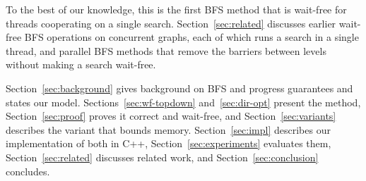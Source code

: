 To the best of our knowledge, this is the first BFS method that is wait-free for threads cooperating on a single search. Section~\ref{sec:related} discusses earlier wait-free BFS operations on concurrent graphs, each of which runs a search in a single thread, and parallel BFS methods that remove the barriers between levels without making a search wait-free.

Section~\ref{sec:background} gives background on BFS and progress guarantees and states our model. Sections~\ref{sec:wf-topdown} and~\ref{sec:dir-opt} present the method, Section~\ref{sec:proof} proves it correct and wait-free, and Section~\ref{sec:variants} describes the variant that bounds memory. Section~\ref{sec:impl} describes our implementation of both in C++, Section~\ref{sec:experiments} evaluates them, Section~\ref{sec:related} discusses related work, and Section~\ref{sec:conclusion} concludes.
